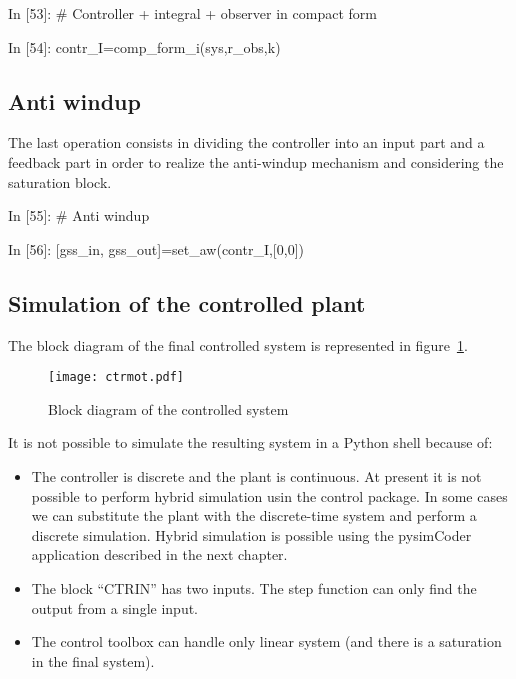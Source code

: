 \begin{code}
In [53]: # Controller + integral + observer in compact form

In [54]: contr_I=comp_form_i(sys,r_obs,k)
\end{code}

\subsection{Anti windup}

The last operation consists in  dividing the controller into an input part and 
a feedback 
part in order to realize the anti-windup mechanism and considering the 
saturation block.

\begin{code}
In [55]: # Anti windup

In [56]: [gss_in, gss_out]=set_aw(contr_I,[0,0])
\end{code}

\subsection{Simulation of the controlled plant}

The block diagram of the final controlled system is represented in 
figure~\ref{F16}.

\begin{figure}[htbp]	%
\centering
\texttt{[image: ctrmot.pdf]}
\caption{Block diagram of the controlled system}
\label{F16}
\end{figure}

It is not possible to simulate the resulting system in a Python shell because of:

\begin{itemize}
\item The controller is discrete and the plant is continuous. At present it is 
not possible to perform hybrid simulation usin the control package. In some 
cases we can substitute the plant with the discrete-time system and perform a 
discrete 
simulation. Hybrid simulation is possible using the pysimCoder application 
described in the next chapter.
\item The block ``CTRIN'' has two inputs. The step function can only find the 
output from a single input.
\item The control toolbox can handle only linear system (and there is a 
saturation in the final system).
\end{itemize}


